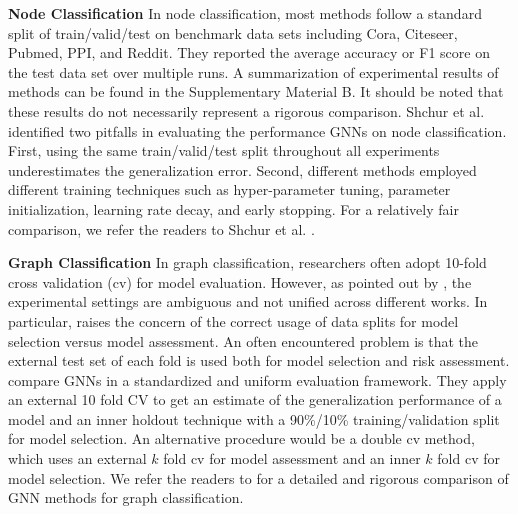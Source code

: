     \vspace{1mm}
    \textbf{Node Classification} In node classification, most methods follow a standard split of train/valid/test on benchmark data sets including Cora, Citeseer, Pubmed, PPI, and Reddit.  They reported the average accuracy or F1 score on the test data set over multiple runs. A summarization of experimental results of methods can be found in the Supplementary Material B.  It should be noted that these results do not necessarily represent a rigorous comparison. 
    Shchur et al. identified \cite{shchur2018pitfalls} two pitfalls in evaluating the performance GNNs on node classification. First, using the same train/valid/test split throughout all experiments underestimates the generalization error. Second, different methods employed different training techniques such as hyper-parameter tuning, parameter initialization, learning rate decay, and early stopping. For a relatively fair comparison, we refer the readers to  Shchur et al. \cite{shchur2018pitfalls}. 
    
    \vspace{1mm}
    \textbf{Graph Classification} In graph classification, researchers often adopt 10-fold cross validation (cv) for model evaluation. However, as pointed out by \cite{anonymous2020a}, the experimental settings are ambiguous and not unified across different works. In particular, \cite{anonymous2020a} raises the concern of the correct usage of data splits for model selection versus model assessment. An often encountered problem is that the external test set of each fold is used both for model selection and risk assessment. \cite{anonymous2020a} compare GNNs in a standardized and uniform evaluation framework. They apply an external 10 fold CV to get an estimate of the generalization performance of a model and  an inner holdout technique with a 90\%/10\% training/validation split for model selection. An alternative procedure would be a double cv method, which uses an external $k$ fold cv for model assessment and an inner $k$ fold cv for model selection. We refer the readers to \cite{anonymous2020a} for a detailed and rigorous comparison of GNN methods for graph classification.
    
